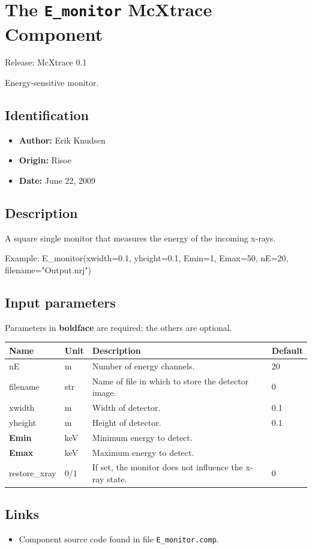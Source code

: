 \section{The \texttt{E\_monitor} McXtrace Component}
Release: McXtrace 0.1

Energy-sensitive monitor.

\subsection*{Identification}
\begin{itemize}
  \item \textbf{Author:} Erik Knudsen
  \item \textbf{Origin:} Risoe
  \item \textbf{Date:} June 22, 2009
\end{itemize}

\subsection*{Description}
A square single monitor that measures the energy of the incoming x-rays.

Example: E\_monitor(xwidth=0.1, yheight=0.1, Emin=1, Emax=50, nE=20, filename="Output.nrj")

\subsection*{Input parameters}
Parameters in \textbf{boldface} are required; the others are optional.

\begin{longtable}{p{}p{}p{}p{}}
\toprule
\textbf{Name} & \textbf{Unit} & \textbf{Description} & \textbf{Default} \\
\midrule
\endhead
nE & m & Number of energy channels. & 20 \\
filename & str & Name of file in which to store the detector image. & 0 \\
xwidth & m & Width of detector. & 0.1 \\
yheight & m & Height of detector. & 0.1 \\
\textbf{Emin} & keV & Minimum energy to detect. &  \\
\textbf{Emax} & keV & Maximum energy to detect. &  \\
restore\_xray & 0/1 & If set, the monitor does not influence the x-ray state. & 0 \\
\bottomrule
\end{longtable}

\subsection*{Links}
\begin{itemize}
  \item Component source code found in file \texttt{E\_monitor.comp}.
\end{itemize}
